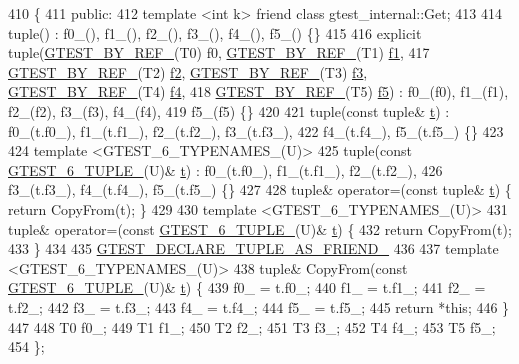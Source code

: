 \begin{DoxyCode}
410                         \{
411  \textcolor{keyword}{public}:
412   \textcolor{keyword}{template} <\textcolor{keywordtype}{int} k> \textcolor{keyword}{friend} \textcolor{keyword}{class }gtest\_internal::Get;
413 
414   tuple() : f0\_(), f1\_(), f2\_(), f3\_(), f4\_(), f5\_() \{\}
415 
416   \textcolor{keyword}{explicit} tuple(\hyperlink{gtest-tuple_8h_adcf9057737a411d833fac0382c13a181}{GTEST\_BY\_REF\_}(T0) f0, \hyperlink{gtest-tuple_8h_adcf9057737a411d833fac0382c13a181}{GTEST\_BY\_REF\_}(T1) 
      \hyperlink{namespacestd_1_1tr1_a9c0fa65b105f8e2f58ba59ecf75fd000}{f1},
417       \hyperlink{gtest-tuple_8h_adcf9057737a411d833fac0382c13a181}{GTEST\_BY\_REF\_}(T2) \hyperlink{namespacestd_1_1tr1_a87dd9e009868361317f587126dba63d4}{f2}, \hyperlink{gtest-tuple_8h_adcf9057737a411d833fac0382c13a181}{GTEST\_BY\_REF\_}(T3) \hyperlink{namespacestd_1_1tr1_a0f7c3b47d27d42d82d1a333ea420ce4e}{f3}, 
      \hyperlink{gtest-tuple_8h_adcf9057737a411d833fac0382c13a181}{GTEST\_BY\_REF\_}(T4) \hyperlink{namespacestd_1_1tr1_adc796e02b7385d526aff708189564f67}{f4},
418       \hyperlink{gtest-tuple_8h_adcf9057737a411d833fac0382c13a181}{GTEST\_BY\_REF\_}(T5) \hyperlink{namespacestd_1_1tr1_a9c1eb66b2b2fa321942af95405232a0d}{f5}) : f0\_(f0), f1\_(f1), f2\_(f2), f3\_(f3), f4\_(f4),
419       f5\_(f5) \{\}
420 
421   tuple(\textcolor{keyword}{const} tuple& \hyperlink{namespacebattery__monitor__node_a7a63d20d1ea461e280f4eb5b47f925cd}{t}) : f0\_(t.f0\_), f1\_(t.f1\_), f2\_(t.f2\_), f3\_(t.f3\_),
422       f4\_(t.f4\_), f5\_(t.f5\_) \{\}
423 
424   \textcolor{keyword}{template} <GTEST\_6\_TYPENAMES\_(U)>
425   tuple(\textcolor{keyword}{const} \hyperlink{gtest-tuple_8h_a53f36c86a979ed8285bf3c6f82f16483}{GTEST\_6\_TUPLE\_}(U)& \hyperlink{namespacebattery__monitor__node_a7a63d20d1ea461e280f4eb5b47f925cd}{t}) : f0\_(t.f0\_), f1\_(t.f1\_), f2\_(t.f2\_),
426       f3\_(t.f3\_), f4\_(t.f4\_), f5\_(t.f5\_) \{\}
427 
428   tuple& operator=(\textcolor{keyword}{const} tuple& \hyperlink{namespacebattery__monitor__node_a7a63d20d1ea461e280f4eb5b47f925cd}{t}) \{ \textcolor{keywordflow}{return} CopyFrom(t); \}
429 
430   \textcolor{keyword}{template} <GTEST\_6\_TYPENAMES\_(U)>
431   tuple& operator=(\textcolor{keyword}{const} \hyperlink{gtest-tuple_8h_a53f36c86a979ed8285bf3c6f82f16483}{GTEST\_6\_TUPLE\_}(U)& \hyperlink{namespacebattery__monitor__node_a7a63d20d1ea461e280f4eb5b47f925cd}{t}) \{
432     \textcolor{keywordflow}{return} CopyFrom(t);
433   \}
434 
435   \hyperlink{gtest-tuple_8h_a2b20671273f514a88a6e9b8328e5f257}{GTEST\_DECLARE\_TUPLE\_AS\_FRIEND\_}
436 
437   \textcolor{keyword}{template} <GTEST\_6\_TYPENAMES\_(U)>
438   tuple& CopyFrom(\textcolor{keyword}{const} \hyperlink{gtest-tuple_8h_a53f36c86a979ed8285bf3c6f82f16483}{GTEST\_6\_TUPLE\_}(U)& \hyperlink{namespacebattery__monitor__node_a7a63d20d1ea461e280f4eb5b47f925cd}{t}) \{
439     f0\_ = t.f0\_;
440     f1\_ = t.f1\_;
441     f2\_ = t.f2\_;
442     f3\_ = t.f3\_;
443     f4\_ = t.f4\_;
444     f5\_ = t.f5\_;
445     \textcolor{keywordflow}{return} *\textcolor{keyword}{this};
446   \}
447 
448   T0 f0\_;
449   T1 f1\_;
450   T2 f2\_;
451   T3 f3\_;
452   T4 f4\_;
453   T5 f5\_;
454 \};
\end{DoxyCode}

